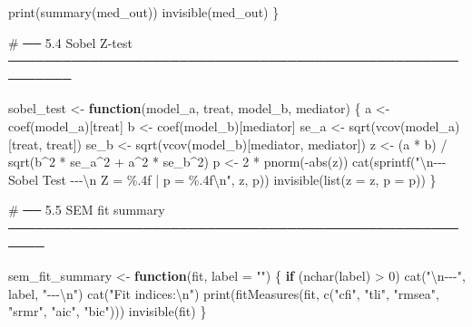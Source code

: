 \documentclass[
  letterpaper,
  DIV=11,
  numbers=noendperiod]{scrartcl}
\newenvironment{Shaded}{\begin{snugshade}}{\end{snugshade}}
\newcommand{\AttributeTok}[1]{\textcolor[rgb]{0.40,0.45,0.13}{#1}}
\newcommand{\CommentTok}[1]{\textcolor[rgb]{0.37,0.37,0.37}{#1}}
\newcommand{\ControlFlowTok}[1]{\textcolor[rgb]{0.00,0.23,0.31}{\textbf{#1}}}
\newcommand{\DecValTok}[1]{\textcolor[rgb]{0.68,0.00,0.00}{#1}}
\newcommand{\FunctionTok}[1]{\textcolor[rgb]{0.28,0.35,0.67}{#1}}
\newcommand{\NormalTok}[1]{\textcolor[rgb]{0.00,0.23,0.31}{#1}}
\newcommand{\OtherTok}[1]{\textcolor[rgb]{0.00,0.23,0.31}{#1}}
\newcommand{\SpecialCharTok}[1]{\textcolor[rgb]{0.37,0.37,0.37}{#1}}
\newcommand{\StringTok}[1]{\textcolor[rgb]{0.13,0.47,0.30}{#1}}
\begin{document}
\begin{Shaded}
\begin{Highlighting}[]
  \FunctionTok{print}\NormalTok{(}\FunctionTok{summary}\NormalTok{(med\_out))}
  \FunctionTok{invisible}\NormalTok{(med\_out)}
\NormalTok{\}}

\CommentTok{\# ── 5.4  Sobel Z{-}test ─────────────────────────────────────────────────────────}

\NormalTok{sobel\_test }\OtherTok{\textless{}{-}} \ControlFlowTok{function}\NormalTok{(model\_a, treat, model\_b, mediator) \{}
\NormalTok{  a    }\OtherTok{\textless{}{-}} \FunctionTok{coef}\NormalTok{(model\_a)[treat]}
\NormalTok{  b    }\OtherTok{\textless{}{-}} \FunctionTok{coef}\NormalTok{(model\_b)[mediator]}
\NormalTok{  se\_a }\OtherTok{\textless{}{-}} \FunctionTok{sqrt}\NormalTok{(}\FunctionTok{vcov}\NormalTok{(model\_a)[treat,    treat])}
\NormalTok{  se\_b }\OtherTok{\textless{}{-}} \FunctionTok{sqrt}\NormalTok{(}\FunctionTok{vcov}\NormalTok{(model\_b)[mediator, mediator])}
\NormalTok{  z    }\OtherTok{\textless{}{-}}\NormalTok{ (a }\SpecialCharTok{*}\NormalTok{ b) }\SpecialCharTok{/} \FunctionTok{sqrt}\NormalTok{(b}\SpecialCharTok{\^{}}\DecValTok{2} \SpecialCharTok{*}\NormalTok{ se\_a}\SpecialCharTok{\^{}}\DecValTok{2} \SpecialCharTok{+}\NormalTok{ a}\SpecialCharTok{\^{}}\DecValTok{2} \SpecialCharTok{*}\NormalTok{ se\_b}\SpecialCharTok{\^{}}\DecValTok{2}\NormalTok{)}
\NormalTok{  p    }\OtherTok{\textless{}{-}} \DecValTok{2} \SpecialCharTok{*} \FunctionTok{pnorm}\NormalTok{(}\SpecialCharTok{{-}}\FunctionTok{abs}\NormalTok{(z))}
  \FunctionTok{cat}\NormalTok{(}\FunctionTok{sprintf}\NormalTok{(}\StringTok{"}\SpecialCharTok{\textbackslash{}n}\StringTok{{-}{-}{-} Sobel Test {-}{-}{-}}\SpecialCharTok{\textbackslash{}n}\StringTok{  Z = \%.4f  |  p = \%.4f}\SpecialCharTok{\textbackslash{}n}\StringTok{"}\NormalTok{, z, p))}
  \FunctionTok{invisible}\NormalTok{(}\FunctionTok{list}\NormalTok{(}\AttributeTok{z =}\NormalTok{ z, }\AttributeTok{p =}\NormalTok{ p))}
\NormalTok{\}}

\CommentTok{\# ── 5.5  SEM fit summary ──────────────────────────────────────────────────────}

\NormalTok{sem\_fit\_summary }\OtherTok{\textless{}{-}} \ControlFlowTok{function}\NormalTok{(fit, }\AttributeTok{label =} \StringTok{""}\NormalTok{) \{}
  \ControlFlowTok{if}\NormalTok{ (}\FunctionTok{nchar}\NormalTok{(label) }\SpecialCharTok{\textgreater{}} \DecValTok{0}\NormalTok{) }\FunctionTok{cat}\NormalTok{(}\StringTok{"}\SpecialCharTok{\textbackslash{}n}\StringTok{{-}{-}{-}"}\NormalTok{, label, }\StringTok{"{-}{-}{-}}\SpecialCharTok{\textbackslash{}n}\StringTok{"}\NormalTok{)}
  \FunctionTok{cat}\NormalTok{(}\StringTok{"Fit indices:}\SpecialCharTok{\textbackslash{}n}\StringTok{"}\NormalTok{)}
  \FunctionTok{print}\NormalTok{(}\FunctionTok{fitMeasures}\NormalTok{(fit, }\FunctionTok{c}\NormalTok{(}\StringTok{"cfi"}\NormalTok{, }\StringTok{"tli"}\NormalTok{, }\StringTok{"rmsea"}\NormalTok{, }\StringTok{"srmr"}\NormalTok{, }\StringTok{"aic"}\NormalTok{, }\StringTok{"bic"}\NormalTok{)))}
  \FunctionTok{invisible}\NormalTok{(fit)}
\NormalTok{\}}


\end{Highlighting}
\end{Shaded}
\end{document}
